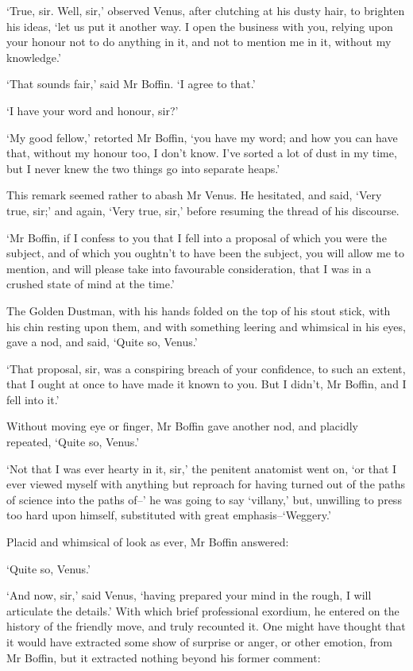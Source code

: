 ‘True, sir. Well, sir,’ observed Venus, after clutching at his dusty
hair, to brighten his ideas, ‘let us put it another way. I open the
business with you, relying upon your honour not to do anything in it,
and not to mention me in it, without my knowledge.’

‘That sounds fair,’ said Mr Boffin. ‘I agree to that.’

‘I have your word and honour, sir?’

‘My good fellow,’ retorted Mr Boffin, ‘you have my word; and how you
can have that, without my honour too, I don’t know. I’ve sorted a lot
of dust in my time, but I never knew the two things go into separate
heaps.’

This remark seemed rather to abash Mr Venus. He hesitated, and said,
‘Very true, sir;’ and again, ‘Very true, sir,’ before resuming the
thread of his discourse.

‘Mr Boffin, if I confess to you that I fell into a proposal of which you
were the subject, and of which you oughtn’t to have been the subject,
you will allow me to mention, and will please take into favourable
consideration, that I was in a crushed state of mind at the time.’

The Golden Dustman, with his hands folded on the top of his stout
stick, with his chin resting upon them, and with something leering and
whimsical in his eyes, gave a nod, and said, ‘Quite so, Venus.’

‘That proposal, sir, was a conspiring breach of your confidence, to
such an extent, that I ought at once to have made it known to you. But I
didn’t, Mr Boffin, and I fell into it.’

Without moving eye or finger, Mr Boffin gave another nod, and placidly
repeated, ‘Quite so, Venus.’

‘Not that I was ever hearty in it, sir,’ the penitent anatomist went
on, ‘or that I ever viewed myself with anything but reproach for having
turned out of the paths of science into the paths of--’ he was going
to say ‘villany,’ but, unwilling to press too hard upon himself,
substituted with great emphasis--‘Weggery.’

Placid and whimsical of look as ever, Mr Boffin answered:

‘Quite so, Venus.’

‘And now, sir,’ said Venus, ‘having prepared your mind in the rough, I
will articulate the details.’ With which brief professional exordium, he
entered on the history of the friendly move, and truly recounted it. One
might have thought that it would have extracted some show of surprise or
anger, or other emotion, from Mr Boffin, but it extracted nothing beyond
his former comment:

